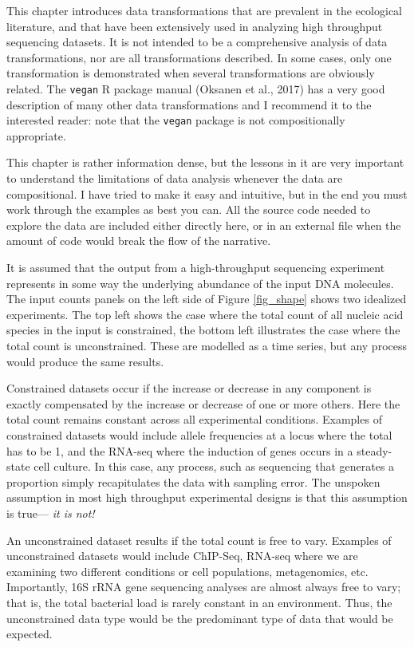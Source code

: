 \documentclass[twocolumn]{article}
\begin{document}
This chapter introduces data transformations that are prevalent in the
ecological literature, and that have been extensively used in analyzing
high throughput sequencing datasets. It is not intended to be a
comprehensive analysis of data transformations, nor are all
transformations described. In some cases, only one transformation is
demonstrated when several transformations are obviously related. The
\texttt{vegan} R package manual (Oksanen et al., 2017) has a very good
description of many other data transformations and I recommend it to the
interested reader: note that the \texttt{vegan} package is not
compositionally appropriate.

This chapter is rather information dense, but the lessons in it are very
important to understand the limitations of data analysis whenever the
data are compositional. I have tried to make it easy and intuitive, but
in the end you must work through the examples as best you can. All the
source code needed to explore the data are included either directly
here, or in an external file when the amount of code would break the
flow of the narrative.

It is assumed that the output from a high-throughput sequencing
experiment represents in some way the underlying abundance of the input
DNA molecules. The input counts panels on the left side of Figure
\ref{fig_shape} shows two idealized experiments. The top left shows the
case where the total count of all nucleic acid species in the input is
constrained, the bottom left illustrates the case where the total count
is unconstrained. These are modelled as a time series, but any process
would produce the same results.

Constrained datasets occur if the increase or decrease in any component
is exactly compensated by the increase or decrease of one or more
others. Here the total count remains constant across all experimental
conditions. Examples of constrained datasets would include allele
frequencies at a locus where the total has to be 1, and the RNA-seq
where the induction of genes occurs in a steady-state cell culture. In
this case, any process, such as sequencing that generates a proportion
simply recapitulates the data with sampling error. The unspoken
assumption in most high throughput experimental designs is that this
assumption is true---\emph{ it is not!}

An unconstrained dataset results if the total count is free to vary.
Examples of unconstrained datasets would include ChIP-Seq, RNA-seq where
we are examining two different conditions or cell populations,
metagenomics, etc. Importantly, 16S rRNA gene sequencing analyses are
almost always free to vary; that is, the total bacterial load is rarely
constant in an environment. Thus, the unconstrained data type would be
the predominant type of data that would be expected.
\end{document}
